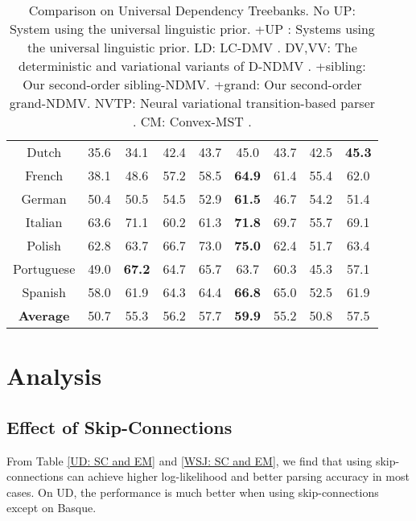 \documentclass[11pt]{article}
\begin{document}
\begin{table}[tbp]
\begin{tabular}{ccccccccc}
\multicolumn{1}{c|}{Dutch} &
  35.6 &
  34.1 &
  42.4 &
  \multicolumn{1}{c|}{43.7} &
  45.0 &
  \multicolumn{1}{c|}{43.7} &
  42.5 &
  \textbf{45.3} \\
\multicolumn{1}{c|}{French} &
  38.1 &
  48.6 &
  57.2 &
  \multicolumn{1}{c|}{58.5} &
  \textbf{64.9} &
  \multicolumn{1}{c|}{61.4} &
  55.4 &
  62.0 \\
\multicolumn{1}{c|}{German} &
  50.4 &
  50.5 &
  54.5 &
  \multicolumn{1}{c|}{52.9} &
  \textbf{61.5} &
  \multicolumn{1}{c|}{46.7} &
  54.2 &
  51.4 \\
\multicolumn{1}{c|}{Italian} &
  63.6 &
  71.1 &
  60.2 &
  \multicolumn{1}{c|}{61.3} &
  \textbf{71.8} &
  \multicolumn{1}{c|}{69.7} &
  55.7 &
  69.1 \\
\multicolumn{1}{c|}{Polish} &
  62.8 &
  63.7 &
  66.7 &
  \multicolumn{1}{c|}{73.0} &
  \textbf{75.0} &
  \multicolumn{1}{c|}{62.4} &
  51.7 &
  63.4 \\
\multicolumn{1}{c|}{Portuguese} &
  49.0 &
  \textbf{67.2} &
  64.7 &
  \multicolumn{1}{c|}{65.7} &
  63.7 &
  \multicolumn{1}{c|}{60.3} &
  45.3 &
  57.1 \\
\multicolumn{1}{c|}{Spanish} &
  58.0 &
  61.9 &
  64.3 &
  \multicolumn{1}{c|}{64.4} &
  \textbf{66.8} &
  \multicolumn{1}{c|}{65.0} &
  52.5 &
  61.9 \\ \hline
\multicolumn{1}{c|}{\textbf{Average}} &
  50.7 &
  55.3 &
  56.2 &
  \multicolumn{1}{c|}{57.7} &
  \textbf{59.9} &
  \multicolumn{1}{c|}{55.2} &
  50.8 &
  57.5 \\ \hline
\end{tabular}
\caption{Comparison on Universal Dependency Treebanks. No UP: System using the universal linguistic prior. +UP : Systems using the universal linguistic prior.  LD: LC-DMV \cite{Noji2015LeftcornerPF}. DV,VV: The deterministic and variational variants of D-NDMV \cite{Han2019EnhancingUG}. +sibling: Our second-order sibling-NDMV. +grand: Our second-order grand-NDMV.  NVTP: Neural variational transition-based
parser \cite{Li2018DependencyGI}. CM: Convex-MST \cite{Grave2015ACA}.}
\label{ud_result}
\end{table}

\section{Analysis}
\subsection{Effect of Skip-Connections}
From Table \ref{UD: SC and EM} and \ref{WSJ: SC and EM}, we find that using skip-connections can achieve higher log-likelihood and better parsing accuracy in most cases. On UD, the performance is much better when using skip-connections except on Basque. 
\end{document}

